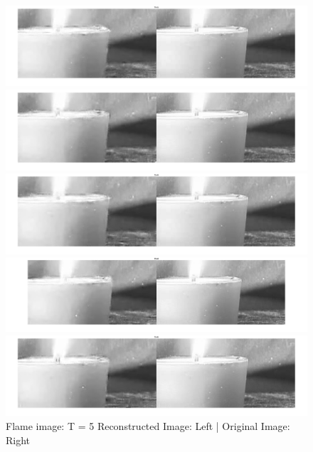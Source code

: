 \documentclass{article}
\begin{document}
\begin{figure}[ht]
	\centering
	\begin{minipage}[!htb]{0.4\linewidth}
		\centering
			\includegraphics[scale=0.07]{flame/t1.jpg}
			\caption{$t = 1$}
			\includegraphics[scale=0.07]{flame/t2.jpg}
			\caption{$t = 2$}
			\includegraphics[scale=0.07]{flame/t3.jpg}
			\caption{$t = 3$}
	\end{minipage}
\begin{minipage}[!htb]{0.5\linewidth}
\centering
	\includegraphics[scale=0.06]{flame/t4.jpg}
	\caption{$t = 4$}
	\includegraphics[scale=0.06]{flame/t5.jpg}
	\caption{$t = 5$}
\end{minipage}
\caption{Flame image: T = 5  Reconstructed Image: Left | Original Image: Right}
\end{figure}
\end{document}
